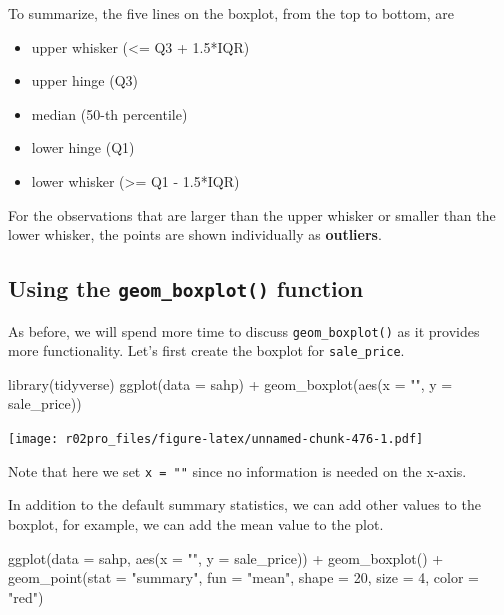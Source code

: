 \documentclass[
]{book}
\newenvironment{Shaded}{\begin{snugshade}}{\end{snugshade}}
\newcommand{\AttributeTok}[1]{\textcolor[rgb]{0.77,0.63,0.00}{#1}}
\newcommand{\DecValTok}[1]{\textcolor[rgb]{0.00,0.00,0.81}{#1}}
\newcommand{\FunctionTok}[1]{\textcolor[rgb]{0.00,0.00,0.00}{#1}}
\newcommand{\NormalTok}[1]{#1}
\newcommand{\SpecialCharTok}[1]{\textcolor[rgb]{0.00,0.00,0.00}{#1}}
\newcommand{\StringTok}[1]{\textcolor[rgb]{0.31,0.60,0.02}{#1}}
\providecommand{\tightlist}{%
  \setlength{\itemsep}{0pt}\setlength{\parskip}{0pt}}
\begin{document}
To summarize, the five lines on the boxplot, from the top to bottom, are

\begin{itemize}
\tightlist
\item
  upper whisker (\textless= Q3 + 1.5*IQR)
\item
  upper hinge (Q3)
\item
  median (50-th percentile)
\item
  lower hinge (Q1)
\item
  lower whisker (\textgreater= Q1 - 1.5*IQR)
\end{itemize}

For the observations that are larger than the upper whisker or smaller than the lower whisker, the points are shown individually as \textbf{outliers}.

\hypertarget{boxplot-1}{%
\subsection{\texorpdfstring{Using the \texttt{geom\_boxplot()} function}{Using the geom\_boxplot() function}}\label{boxplot-1}}

As before, we will spend more time to discuss \texttt{geom\_boxplot()} as it provides more functionality. Let's first create the boxplot for \texttt{sale\_price}.

\begin{Shaded}
\begin{Highlighting}[]
\FunctionTok{library}\NormalTok{(tidyverse)}
\FunctionTok{ggplot}\NormalTok{(}\AttributeTok{data =}\NormalTok{ sahp) }\SpecialCharTok{+} \FunctionTok{geom\_boxplot}\NormalTok{(}\FunctionTok{aes}\NormalTok{(}\AttributeTok{x =} \StringTok{""}\NormalTok{, }\AttributeTok{y =}\NormalTok{ sale\_price))}
\end{Highlighting}
\end{Shaded}

\texttt{[image: r02pro\_files/figure-latex/unnamed-chunk-476-1.pdf]}

Note that here we set \texttt{x\ =\ ""} since no information is needed on the x-axis.

In addition to the default summary statistics, we can add other values to the boxplot, for example, we can add the mean value to the plot.

\begin{Shaded}
\begin{Highlighting}[]
\FunctionTok{ggplot}\NormalTok{(}\AttributeTok{data =}\NormalTok{ sahp, }\FunctionTok{aes}\NormalTok{(}\AttributeTok{x =} \StringTok{""}\NormalTok{, }\AttributeTok{y =}\NormalTok{ sale\_price)) }\SpecialCharTok{+} \FunctionTok{geom\_boxplot}\NormalTok{() }\SpecialCharTok{+}
  \FunctionTok{geom\_point}\NormalTok{(}\AttributeTok{stat =} \StringTok{"summary"}\NormalTok{, }\AttributeTok{fun =} \StringTok{"mean"}\NormalTok{, }\AttributeTok{shape =} \DecValTok{20}\NormalTok{, }\AttributeTok{size =} \DecValTok{4}\NormalTok{, }\AttributeTok{color =} \StringTok{"red"}\NormalTok{)}
\end{Highlighting}
\end{Shaded}
\end{document}
